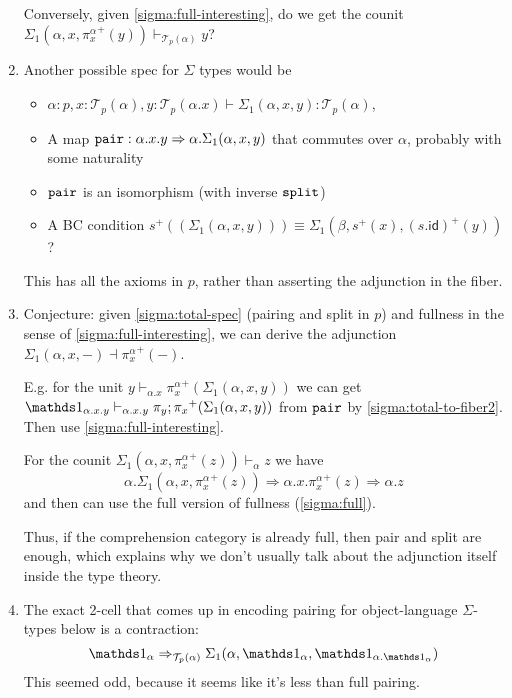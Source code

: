 \documentclass[10pt]{article}
\theoremstyle{definition}
\newcommand{\tcell}{\Rightarrow}
\newcommand{\id}{\mathsf{id}}
\newcommand\TrPlus[2]{\ensuremath{{#1}^+(#2)}}
\newcommand\El[2]{\mathcal{T}_{#1}(#2)}
\begin{document}
\begin{enumerate}
  Conversely, given \ref{sigma:full-interesting}, do we get the counit
  $\Sigma_1(\alpha,x,\TrPlus{\pi^\alpha_x}{y}) \vdash_{\El{p}{\alpha}} y$?

\item \label{sigma:total-spec} Another possible spec for $\Sigma$ types
  would be
  \begin{itemize}
  \item $\alpha : p, x : \El{p}{\alpha}, y : \El{p}{\alpha.x} \vdash \Sigma_1(\alpha,x,y) : \El{p}{\alpha}$,
  \item A map $\mtt{pair} : \alpha.x.y \tcell
    \alpha.\Sigma_1(\alpha,x,y)$ that commutes over $\alpha$, probably
    with some naturality
  \item $\mathtt{pair}$ is an isomorphism (with inverse $\mathtt{split}$)
  \item A BC condition $\TrPlus{s}{(\Sigma_1(\alpha,x,y))} \equiv
    \Sigma_1(\beta,\TrPlus{s}{x}, \TrPlus{(s . \id)}{y})$?
  \end{itemize}

  This has all the axioms in $p$, rather than asserting the adjunction
  in the fiber.

\item Conjecture: given \ref{sigma:total-spec} (pairing and split in
  $p$) and fullness in the sense of \ref{sigma:full-interesting}, we
  can derive the adjunction $\Sigma_1(\alpha,x,-) \dashv
  \TrPlus{\pi^\alpha_x}{-}$.

  E.g. for the unit $y \vdash_{\alpha.x} \TrPlus{\pi^\alpha_x}{\Sigma_1(\alpha,x,y)}$
  we can get
  $\One_{\alpha.x.y} \vdash_{\alpha.x.y} \TrPlus{\pi_y;\pi_x}{\Sigma_1(\alpha,x,y)}$
  from $\mathtt{pair}$ by \ref{sigma:total-to-fiber2}.
  Then use \ref{sigma:full-interesting}.  

  For the counit
  $\Sigma_1(\alpha,x,\TrPlus{\pi^\alpha_x}{z}) \vdash_{\alpha} z$
  we have
  \[
  \alpha.\Sigma_1(\alpha,x,\TrPlus{\pi^\alpha_x}{z}) \tcell \alpha.x.\TrPlus{\pi^\alpha_x}{z} \tcell \alpha.z 
  \]
  and then can use the full version of fullness (\ref{sigma:full}).    

  Thus, if the comprehension category is already full, then pair and
  split are enough, which explains why we don't usually talk about the
  adjunction itself inside the type theory.  
  
\item The exact 2-cell that comes up in encoding pairing for
  object-language $\Sigma$-types below is a contraction:
  \[
  \One_\alpha \tcell_{\El{p}{\alpha}} \Sigma_1(\alpha,\One_\alpha,\One_{\alpha.{\One_\alpha}})
  \]
  This seemed odd, because it seems like it's less than full pairing.    


\end{enumerate}
\end{document}
